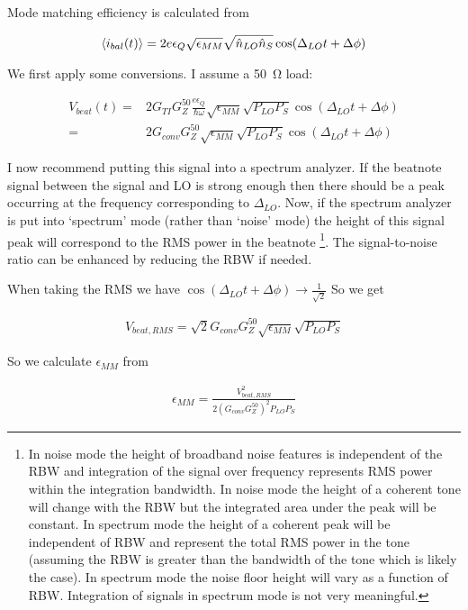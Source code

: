 \documentclass[12pt]{article}
\newcommand{\ep}{\epsilon}
\begin{document}
Mode matching efficiency is calculated from

\begin{align}
\Braket{i_{bal}(t)} = 2e \ep_Q \sqrt{\ep_{MM}}\sqrt{\hat{n}_{LO}\hat{n}_S} \cos(\Delta_{LO} t + \Delta \phi)
\end{align}

We first apply some conversions. I assume a \SI{50}{\ohm} load:

\begin{align}
V_{beat}(t) =& 2 G_{TI}G_Z^{50} \frac{e \ep_Q}{\hbar \omega} \sqrt{\ep_{MM}} \sqrt{P_{LO}P_S} \cos(\Delta_{LO}t + \Delta \phi)\\
=& 2 G_{conv} G_Z^{50} \sqrt{\ep_{MM}} \sqrt{P_{LO}P_S}\cos(\Delta_{LO} t + \Delta \phi)
\end{align}

I now recommend putting this signal into a spectrum analyzer. 
If the beatnote signal between the signal and LO is strong enough then there should be a peak occurring at the frequency corresponding to $\Delta_{LO}$.
Now, if the spectrum analyzer is put into `spectrum' mode (rather than `noise' mode) the height of this signal peak will correspond to the RMS power in the beatnote \footnote{In noise mode the height of broadband noise features is independent of the RBW and integration of the signal over frequency represents RMS power within the integration bandwidth. In noise mode the height of a coherent tone will change with the RBW but the integrated area under the peak will be constant. In spectrum mode the height of a coherent peak will be independent of RBW and represent the total RMS power in the tone (assuming the RBW is greater than the bandwidth of the tone which is likely the case). In spectrum mode the noise floor height will vary as a function of RBW. Integration of signals in spectrum mode is not very meaningful.}. 
The signal-to-noise ratio can be enhanced by reducing the RBW if needed.

When taking the RMS we have $\cos(\Delta_{LO} t + \Delta \phi) \rightarrow \frac{1}{\sqrt{2}}$
So we get

\begin{align}
V_{beat,RMS} = \sqrt{2}G_{conv}G_Z^{50}\sqrt{\ep_{MM}}\sqrt{P_{LO}P_S}
\end{align}

So we calculate $\ep_{MM}$ from

\begin{align}
\ep_{MM} = \frac{V_{beat, RMS}^2}{2\left(G_{conv}G_Z^{50}\right)^2 P_{LO} P_S}
\end{align}
\end{document}
